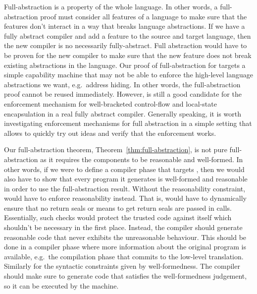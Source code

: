 \begin{jversion}
  Full-abstraction is a property of the whole language.
  In other words, a full-abstraction proof must consider all features of a language to make sure that the features don't interact in a way that breaks language abstractions.
  If we have a fully abstract compiler and add a feature to the source and target language, then the new compiler is no necessarily fully-abstract.
  Full abstraction would have to be proven for the new compiler to make sure that the new feature does not break existing abstractions in the language.
  Our proof of full-abstraction for \stktokens{} targets a simple capability machine that may not be able to enforce the high-level language abstractions we want, e.g.\ address hiding.
  In other words, the full-abstraction proof cannot be reused immediately.
  However, \stktokens{} is still a good candidate for the enforcement mechanism for well-bracketed control-flow and local-state encapsulation in a real fully abstract compiler.
  Generally speaking, it is worth investigating enforcement mechanisms for full abstraction in a simple setting that allows to quickly try out ideas and verify that the enforcement works.

  Our full-abstraction theorem, Theorem~\ref{thm:full-abstraction}, is not pure full-abstraction as it requires the components to be reasonable and well-formed.
  In other words, if we were to define a compiler phase that targets \srccm{}, then we would also have to show that every program it generates is well-formed and reasonable in order to use the full-abstraction result.
  Without the reasonability constraint, \stktokens{} would have to enforce reasonability instead.
  That is, \stktokens{} would have to dynamically ensure that no return seals or means to get return seals are passed in calls.
  Essentially, such checks would protect the trusted code against itself which shouldn't be necessary in the first place.
  Instead, the compiler should generate reasonable code that never exhibits the unreasonable behaviour.
  This should be done in a compiler phase where more information about the original program is available, e.g.\ the compilation phase that commits to the low-level translation.
  Similarly for the syntactic constraints given by well-formedness.
  The compiler should make sure to generate code that satisfies the well-formedness judgement, so it can be executed by the machine.


\end{jversion}
